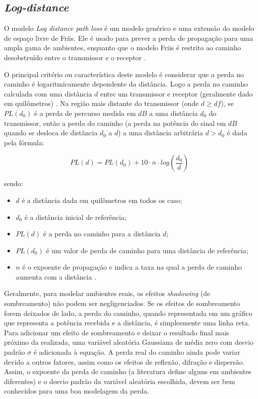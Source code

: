 \documentclass[
	12pt,				%
	twoside,			%
	a4paper,			%
	english,			%
	french,				%
	spanish,			%
	brazil				%
	]{abntex2}
\begin{document}
\subsection{\texorpdfstring{\emph{Log-distance}}{Log-distance}}\label{sec:log_distance}

O modelo \emph{Log distance path loss} é um modelo genérico e uma
extensão do modelo de espaço livre de Friis. Ele é usado para prever a
perda de propagação para uma ampla gama de ambientes, enquanto que o
modelo Friis é restrito ao caminho desobstruído entre o transmissor e o
receptor \cite{LUO}.

O principal critério ou característica deste modelo é considerar que a
perda no caminho é logaritmicamente dependente da distância. Logo a
perda no caminho calculada com uma distância \(d\) entre um transmissor
e receptor (geralmente dado em quilômetros) . Na região mais distante do
transmissor (onde \(d \geq df\)), se \(PL(d_{0})\) é a perda de percurso
medida em \(dB\) a uma distância \(d_{0}\) do transmissor, então a perda
do caminho (a perda na potência do sinal em \(dB\) quando se desloca de
distância \(d_{0}\) a \(d\)) a uma distância arbitrária \(d > d_{0}\) é
dada pela fórmula:

\begin{equation}
PL(d) = PL(d_{0}) + 10 \cdot n \cdot log(\frac{d_{0}}{d})
\end{equation}

sendo:

\begin{itemize}
\item
  \(d\) é a distância dada em quilômetros em todos os caso;
\item
  \(d_{0}\) é a distância inicial de referência;
\item
  \(PL(d)\) é a perda no caminho para a distância \(d\);
\item
  \(PL(d_{0})\) é um valor de perda de caminho para uma distância de
  referência;
\item
  \(n\) é o expoente de propagação e indica a taxa na qual a perda de
  caminho aumenta com a distância \cite{MATHURANATHAN}.
\end{itemize}

Geralmente, para modelar ambientes reais, os efeitos \emph{shadowing}
(de sombreamento) não podem ser negligenciados. Se os efeitos de
sombreamento forem deixados de lado, a perda do caminho, quando
representada em um gráfico que representa a potência recebida e a
distância, é simplesmente uma linha reta. Para adicionar um efeito de
sombreamento e deixar o resultado final mais próximo da realizada, uma
variável aleatória Gaussiana de média zero com desvio padrão \(\sigma\)
é adicionada à equação. A perda real do caminho ainda pode variar devido
a outros fatores, assim como os efeitos de reflexão, difração e
dispersão. Assim, o expoente da perda de caminho (a literatura define
alguns em ambientes diferentes) e o desvio padrão da variável aleatória
escolhida, devem ser bem conhecidos para uma boa modelagem da perda.
\end{document}
